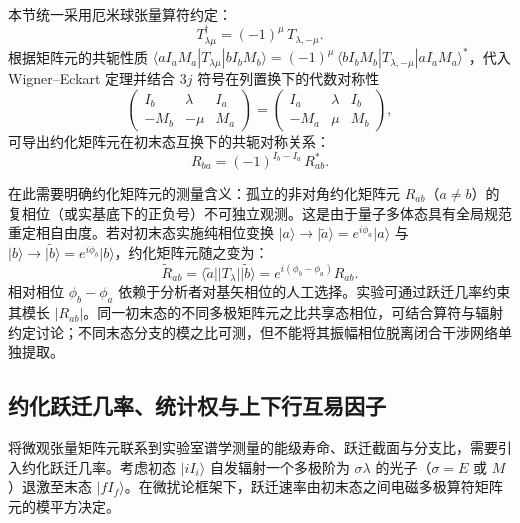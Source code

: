 本节统一采用厄米球张量算符约定：
\begin{equation}\label{eq:2-1-9}
T_{\lambda\mu}^\dagger = (-1)^\mu \, T_{\lambda, -\mu}.
\end{equation}
根据矩阵元的共轭性质 $\langle a I_a M_a | T_{\lambda\mu} | b I_b M_b \rangle = (-1)^\mu \, \langle b I_b M_b | T_{\lambda, -\mu} | a I_a M_a \rangle^*$，代入 Wigner–Eckart 定理并结合 $3j$ 符号在列置换下的代数对称性
\begin{equation*}
\begin{pmatrix} I_b & \lambda & I_a \\ -M_b & -\mu & M_a \end{pmatrix} = \begin{pmatrix} I_a & \lambda & I_b \\ -M_a & \mu & M_b \end{pmatrix},
\end{equation*}
可导出约化矩阵元在初末态互换下的共轭对称关系：
\begin{equation}\label{eq:2-1-10}
R_{ba} = (-1)^{I_b - I_a} \, R_{ab}^*.
\end{equation}

在此需要明确约化矩阵元的测量含义：孤立的非对角约化矩阵元 $R_{ab}$（$a \neq b$）的复相位（或实基底下的正负号）不可独立观测。这是由于量子多体态具有全局规范重定相自由度。若对初末态实施纯相位变换 $|a\rangle \to |\tilde{a}\rangle = e^{i\phi_a} |a\rangle$ 与 $|b\rangle \to |\tilde{b}\rangle = e^{i\phi_b} |b\rangle$，约化矩阵元随之变为：
\begin{equation}\label{eq:2-1-11}
\tilde{R}_{ab} = \langle \tilde{a} || T_\lambda || \tilde{b} \rangle = e^{i(\phi_b - \phi_a)} R_{ab}.
\end{equation}
相对相位 $\phi_b - \phi_a$ 依赖于分析者对基矢相位的人工选择。实验可通过跃迁几率约束其模长 $|R_{ab}|$。同一初末态的不同多极矩阵元之比共享态相位，可结合算符与辐射约定讨论；不同末态分支的模之比可测，但不能将其振幅相位脱离闭合干涉网络单独提取。



\subsection{约化跃迁几率、统计权与上下行互易因子}\label{sec:2-1-3}


将微观张量矩阵元联系到实验室谱学测量的能级寿命、跃迁截面与分支比，需要引入约化跃迁几率。考虑初态 $|i I_i\rangle$ 自发辐射一个多极阶为 $\sigma\lambda$ 的光子（$\sigma = E$ 或 $M$）退激至末态 $|f I_f\rangle$。在微扰论框架下，跃迁速率由初末态之间电磁多极算符矩阵元的模平方决定。

